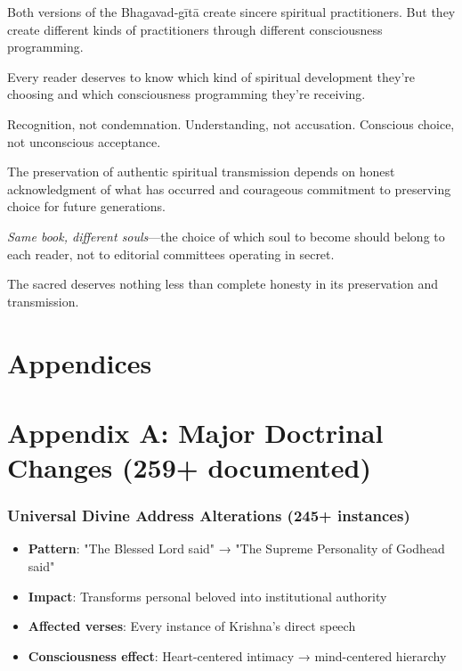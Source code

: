 \documentclass[11pt,twoside]{book}
\begin{document}
Both versions of the Bhagavad-gītā create sincere spiritual practitioners. But they create different kinds of practitioners through different consciousness programming.

Every reader deserves to know which kind of spiritual development they're choosing and which consciousness programming they're receiving.

Recognition, not condemnation. Understanding, not accusation. Conscious choice, not unconscious acceptance.

The preservation of authentic spiritual transmission depends on honest acknowledgment of what has occurred and courageous commitment to preserving choice for future generations.

\textit{Same book, different souls}—the choice of which soul to become should belong to each reader, not to editorial committees operating in secret.

The sacred deserves nothing less than complete honesty in its preservation and transmission.
\part*{Appendices}
\label{sec:orge510883}

\part*{Appendix A: Major Doctrinal Changes (259+ documented)}
\label{sec:org2400cbf}
\section*{Universal Divine Address Alterations (245+ instances)}
\label{sec:org93b5166}
\begin{itemize}
\item \textbf{\textbf{Pattern}}: "The Blessed Lord said" → "The Supreme Personality of Godhead said"
\item \textbf{\textbf{Impact}}: Transforms personal beloved into institutional authority
\item \textbf{\textbf{Affected verses}}: Every instance of Krishna's direct speech
\item \textbf{\textbf{Consciousness effect}}: Heart-centered intimacy → mind-centered hierarchy
\end{itemize}
\end{document}
